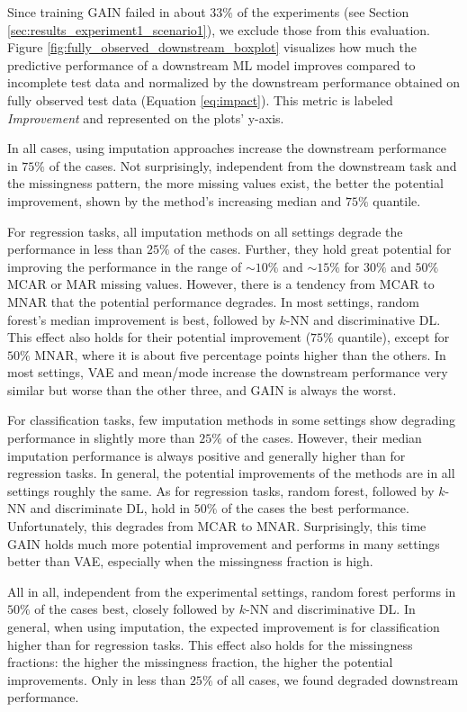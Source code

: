 \documentclass[utf8]{frontiersSCNS} %
\begin{document}
Since training GAIN failed in about $33\%$ of the experiments (see Section \ref{sec:results_experiment1_scenario1}), we exclude those from this evaluation. Figure \ref{fig:fully_observed_downstream_boxplot} visualizes how much the predictive performance of a downstream ML model improves compared to incomplete test data and normalized by the downstream performance obtained on fully observed test data (Equation \ref{eq:impact}). This metric is labeled \textit{Improvement} and represented on the plots' y-axis.

In all cases, using imputation approaches increase the downstream performance in $75\%$ of the cases. Not surprisingly, independent from the downstream task and the missingness pattern, the more missing values exist, the better the potential improvement, shown by the method's increasing median and $75\%$ quantile.

For regression tasks, all imputation methods on all settings degrade the performance in less than $25\%$ of the cases. Further, they hold great potential for improving the performance in the range of $\sim10\%$ and $\sim15\%$ for $30\%$ and $50\%$ MCAR or MAR missing values. However, there is a tendency from MCAR to MNAR that the potential performance degrades. In most settings, random forest's median improvement is best, followed by $k$-NN and discriminative DL. This effect also holds for their potential improvement ($75\%$ quantile), except for $50\%$ MNAR, where it is about five percentage points higher than the others. In most settings, VAE and mean/mode increase the downstream performance very similar but worse than the other three, and GAIN is always the worst.

For classification tasks, few imputation methods in some settings show degrading performance in slightly more than $25\%$ of the cases. However, their median imputation performance is always positive and generally higher than for regression tasks. In general, the potential improvements of the methods are in all settings roughly the same. As for regression tasks, random forest, followed by $k$-NN and discriminate DL, hold in $50\%$ of the cases the best performance. Unfortunately, this degrades from MCAR to MNAR. Surprisingly, this time GAIN holds much more potential improvement and performs in many settings better than VAE, especially when the missingness fraction is high.

All in all, independent from the experimental settings, random forest performs in $50\%$ of the cases best, closely followed by $k$-NN and discriminative DL. In general, when using imputation, the expected improvement is for classification higher than for regression tasks. This effect also holds for the missingness fractions: the higher the missingness fraction, the higher the potential improvements. Only in less than $25\%$ of all cases, we found degraded downstream performance.
\end{document}
